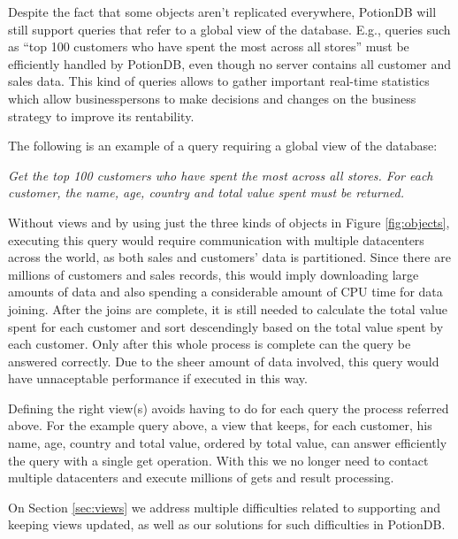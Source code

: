\documentclass{vldb}
\newcommand{\grumbler}[2]{{\color{red}{\bf #1:} #2}}
\renewcommand{\grumbler}[2]{}
\newcommand{\andre}[1]{\grumbler{andre}{#1}}
\newcommand{\emphvspace}{0.5\baselineskip}
\newcommand{\lineemph}[1]{\vspace{\emphvspace}\hspace{2em}\emph{#1}\vspace{\emphvspace}}
\begin{document}
Despite the fact that some objects aren't replicated everywhere, PotionDB will still support queries that refer to a global view of the database.
E.g., queries such as ``top 100 customers who have spent the most across all stores'' must be efficiently handled by PotionDB, even though no server contains all customer and sales data. 
This kind of queries allows to gather important real-time statistics which allow businesspersons to make decisions and changes on the business strategy to improve its rentability.
\andre{Should I refer tpc-h here?}

The following is an example of a query requiring a global view of the database:

\lineemph{Get the top 100 customers who have spent the most across all stores. For each customer, the name, age, country and total value spent must be returned.}

Without views and by using just the three kinds of objects in Figure \ref{fig:objects}, executing this query would require communication with multiple datacenters across the world, as both sales and customers' data is partitioned.
Since there are millions of customers and sales records, this would imply downloading large amounts of data and also spending a considerable amount of CPU time for data joining.
After the joins are complete, it is still needed to calculate the total value spent for each customer and sort descendingly based on the total value spent by each customer.
Only after this whole process is complete can the query be answered correctly.
Due to the sheer amount of data involved, this query would have unnaceptable performance if executed in this way.

Defining the right view(s) avoids having to do for each query the process referred above.
For the example query above, a view that keeps, for each customer, his name, age, country and total value, ordered by total value, can answer efficiently the query with a single get operation.
With this we no longer need to contact multiple datacenters and execute millions of gets and result processing.

On Section \ref{sec:views} we address multiple difficulties related to supporting and keeping views updated, as well as our solutions for such difficulties in PotionDB.


\fi
\end{document}
